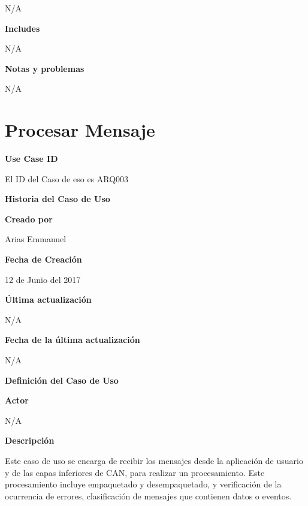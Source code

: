 N/A

\large\textbf{Includes}
\vspace{3mm}

N/A

\large\textbf{Notas y problemas}
\vspace{3mm}

N/A




\section{Procesar Mensaje}

\large\textbf{Use Case ID}
\vspace{3mm}

El ID del Caso de eso es ARQ003

\Large\textbf{Historia del Caso de Uso}
\vspace{3mm}

\large\textbf{Creado por}
\vspace{3mm}

Arias Emmanuel

\large\textbf{Fecha de Creación}
\vspace{3mm}

12 de Junio del 2017

\large\textbf{Última actualización}
\vspace{3mm}

N/A

\large\textbf{Fecha de la última actualización}
\vspace{3mm}

N/A

\Large\textbf{Definición del Caso de Uso}
\vspace{3mm}

\large\textbf{Actor}
\vspace{3mm}

N/A

\large\textbf{Descripción}
\vspace{3mm}

Este caso de uso se encarga de recibir los mensajes desde la aplicación
de usuario y de las capas inferiores de CAN, para realizar un procesamiento.
Este procesamiento incluye empaquetado y desempaquetado, y verificación de
la ocurrencia de errores, clasificación de mensajes que contienen datos
o eventos.

